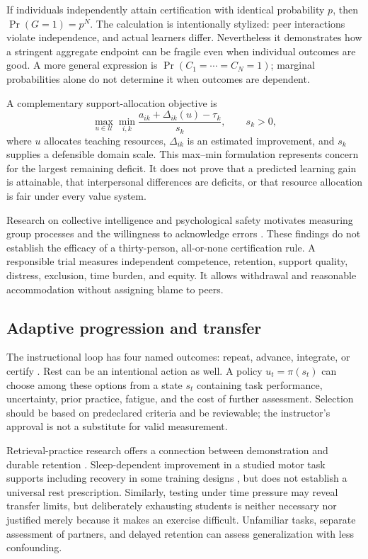 If individuals independently attain certification with identical probability $p$, then $\Pr(G=1)=p^N$. The calculation is intentionally stylized: peer interactions violate independence, and actual learners differ. Nevertheless it demonstrates how a stringent aggregate endpoint can be fragile even when individual outcomes are good. A more general expression is $\Pr(C_1=\cdots=C_N=1)$; marginal probabilities alone do not determine it when outcomes are dependent.

A complementary support-allocation objective is
\begin{equation}
 \max_{u\in\mathcal U}\min_{i,k}
 \frac{a_{ik}+\Delta_{ik}(u)-\tau_k}{s_k},\qquad s_k>0,
\end{equation}
where $u$ allocates teaching resources, $\Delta_{ik}$ is an estimated improvement, and $s_k$ supplies a defensible domain scale. This max--min formulation represents concern for the largest remaining deficit. It does not prove that a predicted learning gain is attainable, that interpersonal differences are deficits, or that resource allocation is fair under every value system.

Research on collective intelligence and psychological safety motivates measuring group processes and the willingness to acknowledge errors \cite{woolley,edmondson}. These findings do not establish the efficacy of a thirty-person, all-or-none certification rule. A responsible trial measures independent competence, retention, support quality, distress, exclusion, time burden, and equity. It allows withdrawal and reasonable accommodation without assigning blame to peers.

\subsection{Adaptive progression and transfer}
The instructional loop has four named outcomes: repeat, advance, integrate, or certify . Rest can be an intentional action as well. A policy $u_t=\pi(s_t)$ can choose among these options from a state $s_t$ containing task performance, uncertainty, prior practice, fatigue, and the cost of further assessment. Selection should be based on predeclared criteria and be reviewable; the instructor's approval is not a substitute for valid measurement.

Retrieval-practice research offers a connection between demonstration and durable retention \cite{roediger}. Sleep-dependent improvement in a studied motor task supports including recovery in some training designs \cite{walker}, but does not establish a universal rest prescription. Similarly, testing under time pressure may reveal transfer limits, but deliberately exhausting students is neither necessary nor justified merely because it makes an exercise difficult. Unfamiliar tasks, separate assessment of partners, and delayed retention can assess generalization with less confounding.

